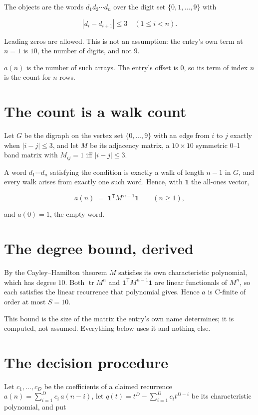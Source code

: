 \documentclass[11pt]{article}
\theoremstyle{definition}
\begin{document}
The objects are the words $d_1 d_2 \cdots d_n$ over the digit set $\{0,1,\dots,9\}$ with

\[|d_i - d_{i+1}| \le 3\quad (1 \le i < n).\]

Leading zeros are allowed. This is not an assumption: the entry's own term at $n=1$ is $10$, the number of digits, and not $9$.

$a(n)$ is the number of such arrays. The entry's offset is 0, so its term of index $n$ is the count for $n$ rows.

\section{The count is a walk count}

Let $G$ be the digraph on the vertex set $\{0,\dots,9\}$ with an edge from $i$ to $j$ exactly when $|i-j| \le 3$, and let $M$ be its adjacency matrix, a $10 \times 10$ symmetric 0--1 band matrix with $M_{ij} = 1$ iff $|i-j| \le 3$.

A word $d_1\cdots d_n$ satisfying the condition is exactly a walk of length $n-1$ in $G$, and every walk arises from exactly one such word. Hence, with $\mathbf 1$ the all-ones vector,

\[a(n) \;=\; \mathbf 1^{\mathsf T} M^{\,n-1} \mathbf 1 \qquad (n \ge 1),\]

and $a(0) = 1$, the empty word.

\section{The degree bound, derived}

By the Cayley--Hamilton theorem $M$ satisfies its own characteristic polynomial, which has degree $10$. Both $\operatorname{tr} M^n$ and $\mathbf 1^{\mathsf T} M^{n-1} \mathbf 1$ are linear functionals of $M^{n}$, so each satisfies the linear recurrence that polynomial gives. Hence $a$ is C-finite of order at most $S = 10$.

This bound is the size of the matrix the entry's own name determines; it is computed, not assumed. Everything below uses it and nothing else.

\section{The decision procedure}

Let $c_1,\dots,c_D$ be the coefficients of a claimed recurrence $a(n) = \sum_{i=1}^{D} c_i\,a(n-i)$, let $q(t) = t^{D} - \sum_{i=1}^{D} c_i t^{D-i}$ be its characteristic polynomial, and put
\end{document}
